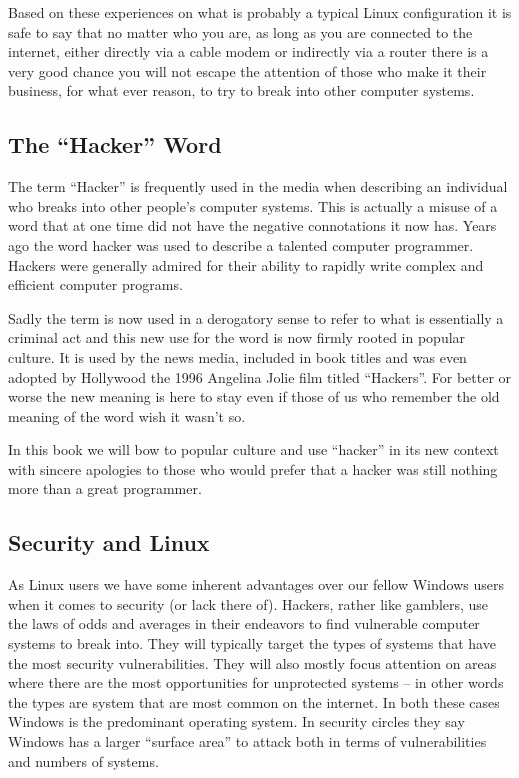 Based on these experiences on what is probably a typical Linux configuration it
is safe to say that no matter who you are, as long as you are connected to the
internet, either directly via a cable modem or indirectly via a router there is
a very good chance you will not escape the attention of those who make it their
business, for what ever reason, to try to break into other computer systems.



\subsectionend

\subsection{The ``Hacker'' Word}
\label{ssec:the_hacker_word}

The term ``{Hacker}'' is frequently used in the media when describing
an individual who breaks into other people’s computer systems. This is actually
a misuse of a word that at one time did not have the negative connotations it
now has. Years ago the word hacker was used to describe a talented computer
programmer. Hackers were generally admired for their ability to rapidly write
complex and efficient computer programs.



Sadly the term is now used in a derogatory sense to refer to what is essentially
a criminal act and this new use for the word is now firmly rooted in popular
culture. It is used by the news media, included in book titles and was even
adopted by Hollywood the 1996 Angelina Jolie film titled “Hackers”. For better
or worse the new meaning is here to stay even if those of us who remember the
old meaning of the word wish it wasn’t so.



In this book we will bow to popular culture and use ``{hacker}''
in its new context with sincere apologies to those who would prefer that a
hacker was still nothing more than a great programmer.

\subsectionend

\subsection{Security and Linux}
\label{ssec:security_and_linux}

As Linux users we have some inherent advantages over our fellow Windows users
when it comes to security (or lack there of). Hackers, rather like gamblers, use
the laws of odds and averages in their endeavors to find vulnerable computer
systems to break into. They will typically target the types of systems that have
the most security vulnerabilities. They will also mostly focus attention on
areas where there are the most opportunities for unprotected systems – in other
words the types are system that are most common on the internet. In both these
cases Windows is the predominant operating system. In security circles they say
Windows has a larger “surface area” to attack both in terms of vulnerabilities
and numbers of systems.



